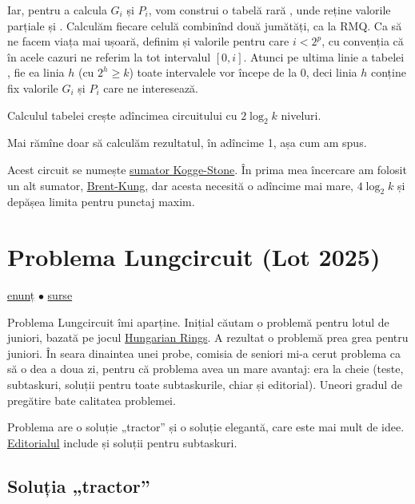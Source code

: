 Iar, pentru a calcula $G_i$ și $P_i$, vom construi o tabelă rară , unde  reține valorile parțiale  și . Calculăm fiecare celulă combinînd două jumătăți, ca la RMQ. Ca să ne facem viața mai ușoară, definim și valorile  pentru care $i < 2^p$, cu convenția că în acele cazuri ne referim la tot intervalul $[0, i]$. Atunci pe ultima linie a tabelei , fie ea linia $h$ (cu $2^h \geq k$) toate intervalele vor începe de la 0, deci linia $h$ conține fix valorile $G_i$ și $P_i$ care ne interesează.

Calculul tabelei  crește adîncimea circuitului cu $2 \log_2 k$ niveluri.

Mai rămîne doar să calculăm rezultatul, în adîncime 1, așa cum am spus.

Acest circuit se numește \href{https://en.wikipedia.org/wiki/Kogge\%E2\%80\%93Stone_adder}{sumator Kogge-Stone}. În prima mea încercare am folosit un alt sumator, \href{https://en.wikipedia.org/wiki/Brent\%E2\%80\%93Kung_adder}{Brent-Kung}, dar acesta necesită o adîncime mai mare, $4 \log_2 k$ și depășea limita pentru punctaj maxim.


\section{Problema Lungcircuit (Lot 2025)}
\label{problem:lungcircuit}

\href{https://kilonova.ro/problems/3807}{enunț}
$\bullet$
\hyperref[code:lungcircuit]{surse}

Problema Lungcircuit îmi aparține. Inițial căutam o problemă pentru lotul de juniori, bazată pe jocul \href{https://ruwix.com/twisty-puzzles/hungarian-rings-sliding-puzzle/}{Hungarian Rings}. A rezultat o problemă prea grea pentru juniori. În seara dinaintea unei probe, comisia de seniori mi-a cerut problema ca să o dea a doua zi, pentru că problema avea un mare avantaj: era la cheie (teste, subtaskuri, soluții pentru toate subtaskurile, chiar și editorial). Uneori gradul de pregătire bate calitatea problemei. 

Problema are o soluție „tractor” și o soluție elegantă, care este mai mult de idee. \href{https://drive.google.com/drive/folders/1EqiZNtAgVsJ-FbrPRqzF-OIpyOPeztnR}{Editorialul} include și soluții pentru subtaskuri.

\subsection{Soluția „tractor”}

